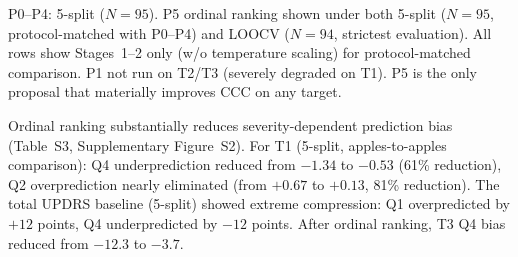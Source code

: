 \documentclass[11pt,a4paper]{article}
\newcommand{\tabnote}[1]{\par\vspace{2pt}\noindent\begin{minipage}{\linewidth}\small\itshape\raggedright #1\par\end{minipage}\par\vspace{0.4em}}
\begin{document}
\begin{table}[H]
\centering
\caption{\textbf{Table~S2.} Compression ablation: five anti-compression proposals across three targets.}
\label{tab:compression}
\small
{}%
\tabnote{P0--P4: 5-split ($N=95$). P5 ordinal ranking shown under both 5-split ($N=95$, protocol-matched with P0--P4) and LOOCV ($N=94$, strictest evaluation). All rows show Stages~1--2 only (w/o temperature scaling) for protocol-matched comparison. P1 not run on T2/T3 (severely degraded on T1). P5 is the only proposal that materially improves CCC on any target.}
\end{table}

Ordinal ranking substantially reduces severity-dependent prediction bias (Table~S3, Supplementary Figure~S2). For T1 (5-split, apples-to-apples comparison): Q4 underprediction reduced from $-1.34$ to $-0.53$ (61\% reduction), Q2 overprediction nearly eliminated (from $+0.67$ to $+0.13$, 81\% reduction). The total UPDRS baseline (5-split) showed extreme compression: Q1 overpredicted by $+12$ points, Q4 underpredicted by $-12$ points. After ordinal ranking, T3 Q4 bias reduced from $-12.3$ to $-3.7$.
\end{document}
